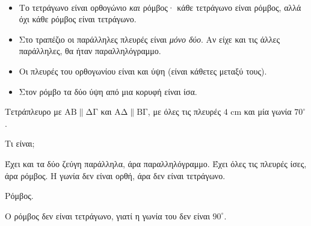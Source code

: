 \begin{center}
\\[4pt]
\end{center}

\begin{prosoxi}
\begin{itemize}[leftmargin=1.2em,itemsep=0.3ex,topsep=2pt]
\item Το τετράγωνο είναι ορθογώνιο \emph{και} ρόμβος· κάθε τετράγωνο είναι ρόμβος, αλλά όχι κάθε ρόμβος είναι τετράγωνο.
\item Στο τραπέζιο οι παράλληλες πλευρές είναι \emph{μόνο δύο}. Αν είχε και τις άλλες παράλληλες, θα ήταν παραλληλόγραμμο.
\item Οι πλευρές του ορθογωνίου είναι και ύψη (είναι κάθετες μεταξύ τους).
\item Στον ρόμβο τα δύο ύψη από μια κορυφή είναι ίσα.
\end{itemize}
\end{prosoxi}


\tixero Τετράπλευρο με $\mathrm{ΑΒ}\parallel\mathrm{ΔΓ}$ και $\mathrm{ΑΔ}\parallel\mathrm{ΒΓ}$, με όλες τις πλευρές $4$ cm και μία γωνία $70^\circ$.\par
\tithelo Τι είναι;\par
\possindeo Έχει και τα δύο ζεύγη παράλληλα, άρα παραλληλόγραμμο. Έχει όλες τις πλευρές ίσες, άρα ρόμβος. Η γωνία δεν είναι ορθή, άρα δεν είναι τετράγωνο.\par
\apantisi Ρόμβος.\par
\elegxos Ο ρόμβος δεν είναι τετράγωνο, γιατί η γωνία του δεν είναι $90^\circ$.

